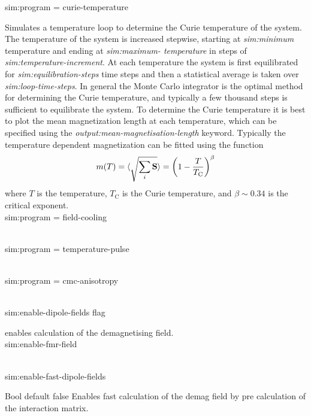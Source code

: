 {\zicf sim:program = curie-temperature} Simulates a temperature loop to determine the Curie temperature of the system. The temperature of the system is increased stepwise, starting at \textit{sim:minimum} temperature and ending at \textit{sim:maximum- temperature} in steps of \textit{sim:temperature-increment}. At each temperature the system is first equilibrated for \textit{sim:equilibration-steps} time steps and then a statistical average is taken over \textit{sim:loop-time-steps}. In general the Monte Carlo integrator is the optimal method for determining the Curie temperature, and typically a few thousand steps is sufficient to equilibrate the system. To determine the Curie temperature it is best to plot the mean magnetization length at each temperature, which can be specified using the \textit{output:mean-magnetisation-length} keyword. Typically the temperature dependent magnetization can be fitted using the function
\begin{equation}
m(T) = \langle{\sqrt{\sum_i \mathbf{S}}}\rangle = \left(1 - \frac{T}{T_{\mathrm{C}}} \right)^{\beta}
\end{equation}
where $T$ is the temperature, $T_{\mathrm{C}}$ is the Curie temperature, and $\beta \sim 0.34$ is the critical exponent.\\

{\zicf sim:program = field-cooling}
\\

{\zicf sim:program = temperature-pulse}\\

{\zicf sim:program = cmc-anisotropy}\\


{\zicf sim:enable-dipole-fields flag} enables calculation of the demagnetising field.\\

{\zicf   sim:enable-fmr-field}\\

{\zicf   sim:enable-fast-dipole-fields}
     Bool default false
     Enables fast calculation of the demag field by pre calculation of the interaction matrix.\\

